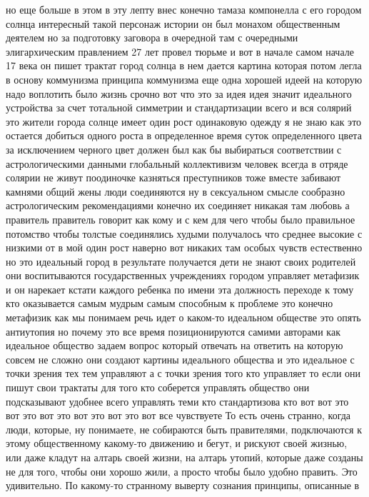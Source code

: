 но еще больше в этом в эту лепту внес конечно тамаза
компонелла с его городом солнца интересный такой персонаж истории он был монахом
общественным деятелем но за подготовку заговора в очередной там с очередными
элигархическим правлением 27 лет провел тюрьме и вот в начале самом начале 17
века он пишет трактат город солнца в нем дается картина которая потом легла в
основу коммунизма принципа коммунизма еще одна хорошей идеей на которую надо
воплотить было жизнь срочно вот что это за идея идея значит идеального
устройства за счет тотальной симметрии и стандартизации всего и вся солярий это
жители города солнце имеет один рост одинаковую одежду я не знаю как это
остается добиться одного роста в определенное время суток определенного цвета за
исключением черного цвет должен был как бы выбираться соответствии с
астрологическими данными глобальный коллективизм человек всегда в отряде солярии
не живут поодиночке казняться преступников тоже вместе забивают камнями общий
жены люди соединяются ну в сексуальном смысле сообразно астрологическим
рекомендациями конечно их соединяет никакая там любовь а правитель правитель
говорит как кому и с кем для чего чтобы было правильное потомство чтобы толстые
соединялись худыми получалось что среднее высокие с низкими от в мой один рост
наверно вот никаких там особых чувств естественно но это идеальный город в
результате получается дети не знают своих родителей они воспитываются
государственных учреждениях городом управляет метафизик и он нарекает кстати
каждого ребенка по имени эта должность переходе к тому кто оказывается самым
мудрым самым способным к проблеме это конечно метафизик как мы понимаем речь
идет о каком-то идеальном обществе это опять антиутопия но почему это все время
позиционируются самими авторами как идеальное общество задаем вопрос который
отвечать на ответить на которую совсем не сложно они создают картины идеального
общества и это идеальное с точки зрения тех тем управляют а с точки зрения того
кто управляет то если они пишут свои трактаты для того кто соберется управлять
общество они подсказывают удобнее всего управлять теми кто стандартизова кто вот
вот это вот это вот это вот это вот это вот все чувствуете То есть очень
странно, когда люди, которые, ну понимаете, не собираются быть правителями,
подключаются к этому общественному какому-то движению и бегут, и рискуют своей
жизнью, или даже кладут на алтарь своей жизни, на алтарь утопий, которые даже
созданы не для того, чтобы они хорошо жили, а просто чтобы было удобно править.
Это удивительно. По какому-то странному выверту сознания принципы, описанные в
